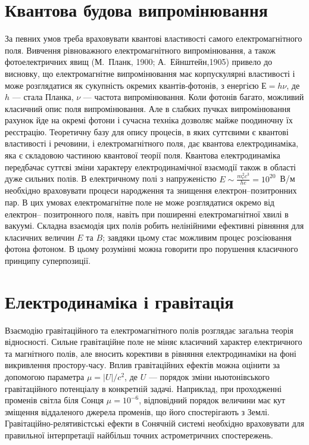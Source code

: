 \section{Квантова будова випромінювання}

За певних умов треба враховувати квантові властивості самого електромагнітного поля. Вивчення рівноважного електромагнітного випромінювання, а також
фотоелектричних явищ (М.~Планк, 1900; А.~Ейнштейн,1905) привело до висновку, що електромагнітне випромінювання має корпускулярні властивості і може
розглядатися як сукупність окремих квантів-фотонів, з енергією $Е=h\nu$, де $h$ --- стала Планка, $\nu$ --- частота випромінювання. Коли фотонів багато,
можливий класичний опис поля випромінювання. Але в слабких пучках випромінювання рахунок йде на окремі фотони і сучасна техніка дозволяє майже
поодиночну їх реєстрацію. Теоретичну базу для опису процесів, в яких суттєвими є квантові властивості і речовини, і електромагнітного поля, дає квантова
електродинаміка, яка є складовою частиною квантової теорії поля. Квантова електродинаміка передбачає суттєві зміни характеру електродинамічної взаємодії
також в області дуже сильних полів. В електричному полі з напруженістю $E \sim \frac{m_e^2 c^3}{he} = 10^{20}$~В/м необхідно враховувати процеси
народження та знищення електрон–позитронних пар. В цих умовах електромагнітне поле не може розглядатися окремо від електрон– позитронного поля, навіть
при поширенні електромагнітної хвилі в вакуумі. Складна взаємодія цих полів робить нелінійними ефективні рівняння для класичних величин $E$ та $B$;
завдяки цьому стає можливим процес розсіювання фотона фотоном. В цьому розумінні можна говорити про порушення класичного принципу суперпозиції.



\section{Електродинаміка і гравітація}

Взаємодію гравітаційного та електромагнітного полів розглядає загальна
теорія відносності. Сильне гравітаційне поле не міняє класичний характер
електричного та магнітного полів, але вносить корективи в рівняння
електродинаміки на фоні викривлення простору-часу. Вплив гравітаційних
ефектів можна оцінити за допомогою параметра $\mu = |U|/c^2$, де $U$ --- порядок
зміни ньютонівського гравітаційного потенціалу в конкретній задачі.
Наприклад, при проходженні променів світла біля Сонця $\mu = 10^{-6}$, відповідний
порядок величини має кут зміщення віддаленого джерела променів, що його
спостерігають з Землі. Гравітаційно-релятивістські ефекти в Сонячній системі
необхідно враховувати для правильної інтерпретації найбільш точних
астрометричних спостережень.



